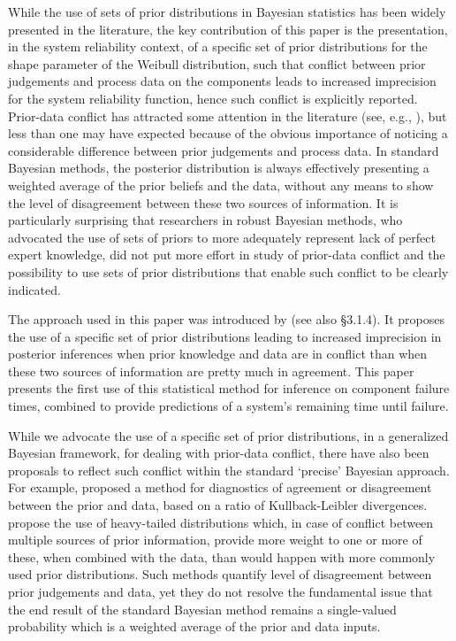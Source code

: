 \documentclass[Journal,letterpaper]{ascelike-new}
\begin{document}
While the use of sets of prior distributions in Bayesian statistics has been widely presented in the
literature, the key contribution of this paper is the presentation, in the system reliability context,
of a specific set of prior distributions for the shape parameter of the Weibull distribution, such 
that conflict between prior judgements and process data on the components leads to increased imprecision
for the system reliability function, hence such conflict is explicitly reported. 
Prior-data conflict has attracted some attention in the literature (see, e.g., ),
but less than one may have expected because of the obvious importance of noticing a considerable
difference between prior judgements and process data. In standard Bayesian methods, the posterior 
distribution is always effectively presenting a weighted average of the prior beliefs and the data,
without any means to show the level of disagreement between these two sources of information. It is
particularly surprising that researchers in robust Bayesian methods, who advocated the use of sets of
priors to more adequately represent lack of perfect expert knowledge, did not put more effort in study
of prior-data conflict and the possibility to use sets of prior distributions that enable such conflict
to be clearly indicated. 

The approach used in this paper was introduced by  (see also  \S 3.1.4).
It proposes the use of a specific set of prior distributions leading to increased imprecision in posterior 
inferences when prior knowledge and data are in conflict than when these two sources of information are
pretty much in agreement. This paper presents the first use of this statistical method for inference on
component failure times, combined to provide predictions of a system's remaining time until failure. 

While we advocate the use of a specific set of prior distributions, in a generalized Bayesian framework,
for dealing with prior-data conflict, there have also been proposals to reflect such conflict within the 
standard `precise' Bayesian approach. For example,  proposed a method for diagnostics 
of agreement or disagreement between the prior and data, based on a ratio of Kullback-Leibler divergences.
 propose the use of heavy-tailed distributions which, in case of conflict 
between multiple sources of prior information, provide more weight to one or more of these, when combined 
with the data, than would happen with more commonly used prior distributions. Such methods 
quantify level of disagreement between prior judgements and data, yet they do not resolve the fundamental 
issue that the end result of the standard Bayesian method remains a single-valued probability
which is a weighted average of the prior and data inputs.
\end{document}
